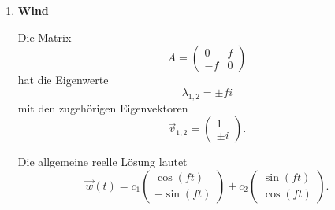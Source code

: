 \begin{enumerate}
          Mit den Anfangsbedingungen findet man:
          \[
              \boxed{
                  \begin{pmatrix}x_1(t)\\y_1(t)\end{pmatrix}
                  =
                  e^{-t}
                  \begin{pmatrix}\cos t\\\sin t\end{pmatrix}
              }
          \]

          Die Bahn ist eine sogenannte \emph{logarithmische Spirale}.
          Sie windet sich unendlich oft um den Ursprung des
          Koordinatensystems.

          Ihre Gesamtlänge ist aber endlich:
          \[
              \begin{aligned}
                  l
                   & =\int_0^\infty
                  \sqrt{\dot{x}_1(t)^2+\dot{y}_1(t)^2}\,\mathrm{d}t \\
                   & =\int_0^\infty \sqrt{2}\,e^{-t}\,\mathrm{d}t   \\
                   & =\boxed{\sqrt{2}}.
              \end{aligned}
          \]

    \item \textbf{Wind}

          Die Matrix
          \[
              A=\begin{pmatrix}
                  0  & f \\
                  -f & 0
              \end{pmatrix}
          \]
          hat die Eigenwerte
          \[
              \lambda_{1,2}=\pm fi
          \]
          mit den zugehörigen Eigenvektoren
          \[
              \vec{v}_{1,2}=
              \begin{pmatrix}1\\\pm i\end{pmatrix}.
          \]

          Die allgemeine reelle Lösung lautet
          \[
              \vec{w}(t)
              =
              c_1\begin{pmatrix}
                  \cos(ft) \\-\sin(ft)
              \end{pmatrix}
              +
              c_2\begin{pmatrix}
                  \sin(ft) \\\cos(ft)
              \end{pmatrix}.
          \]


\end{enumerate}
